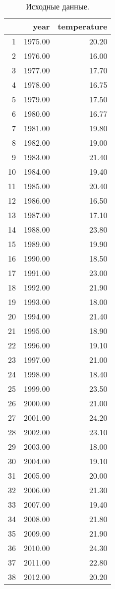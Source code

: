 \begin{table}[H]
\centering
\begin{tabular}{rrr}
  \hline
 & year & temperature \\ 
  \hline
1 & 1975.00 & 20.20 \\ 
  2 & 1976.00 & 16.00 \\ 
  3 & 1977.00 & 17.70 \\ 
  4 & 1978.00 & 16.75 \\ 
  5 & 1979.00 & 17.50 \\ 
  6 & 1980.00 & 16.77 \\ 
  7 & 1981.00 & 19.80 \\ 
  8 & 1982.00 & 19.00 \\ 
  9 & 1983.00 & 21.40 \\ 
  10 & 1984.00 & 19.40 \\ 
  11 & 1985.00 & 20.40 \\ 
  12 & 1986.00 & 16.50 \\ 
  13 & 1987.00 & 17.10 \\ 
  14 & 1988.00 & 23.80 \\ 
  15 & 1989.00 & 19.90 \\ 
  16 & 1990.00 & 18.50 \\ 
  17 & 1991.00 & 23.00 \\ 
  18 & 1992.00 & 21.90 \\ 
  19 & 1993.00 & 18.00 \\ 
  20 & 1994.00 & 21.40 \\ 
  21 & 1995.00 & 18.90 \\ 
  22 & 1996.00 & 19.10 \\ 
  23 & 1997.00 & 21.00 \\ 
  24 & 1998.00 & 18.40 \\ 
  25 & 1999.00 & 23.50 \\ 
  26 & 2000.00 & 21.00 \\ 
  27 & 2001.00 & 24.20 \\ 
  28 & 2002.00 & 23.10 \\ 
  29 & 2003.00 & 18.00 \\ 
  30 & 2004.00 & 19.10 \\ 
  31 & 2005.00 & 20.00 \\ 
  32 & 2006.00 & 21.30 \\ 
  33 & 2007.00 & 19.40 \\ 
  34 & 2008.00 & 21.80 \\ 
  35 & 2009.00 & 21.90 \\ 
  36 & 2010.00 & 24.30 \\ 
  37 & 2011.00 & 22.80 \\ 
  38 & 2012.00 & 20.20 \\ 
   \hline
\end{tabular}
\caption{Исходные данные.} 
\label{table:source}
\end{table}
